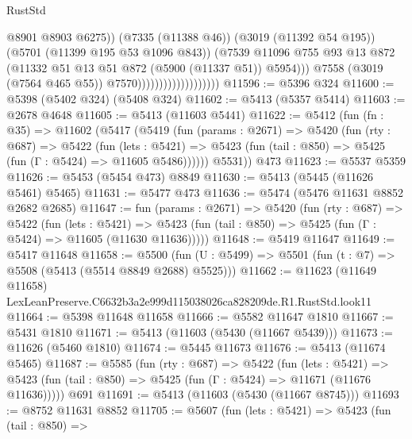 \begin{lexlean}{RustStd}
\begin{coremodule}
                                                @8901
                                                @8903
                                                @6275))
                                            (@7335 (@11388 @46))
                                            (@3019 (@11392 @54 @195))
                                            (@5701 (@11399 @195 @53 @1096 @843))
                                            (@7539
                                              @11096
                                              @755
                                              @93
                                              @13
                                              @872
                                              (@11332 @51 @13 @51 @872 (@5900 (@11337 @51)) @5954)))
                                          @7558
                                          (@3019 (@7564 @465 @55))
                                          @7570)))))))))))))))))))
@11596 := @5396 @324
@11600 := @5398 (@5402 @324) (@5408 @324)
@11602 := @5413 (@5357 @5414)
@11603 := @2678 @4648
@11605 := @5413 (@11603 @5441)
@11622 := @5412
    (fun (fn : @35) =>
    @11602
      (@5417
        (@5419
          (fun (params : @2671) =>
          @5420
            (fun (rty : @687) =>
            @5422
              (fun (lets : @5421) =>
              @5423 (fun (tail : @850) => @5425 (fun (Γ : @5424) => @11605 @5486))))))
        @5531))
    @473
@11623 := @5537 @5359
@11626 := @5453 (@5454 @473) @8849
@11630 := @5413 (@5445 (@11626 @5461) @5465)
@11631 := @5477 @473
@11636 := @5474 (@5476 @11631 @8852 @2682 @2685)
@11647 := fun (params : @2671) =>
  @5420
    (fun (rty : @687) =>
    @5422
      (fun (lets : @5421) =>
      @5423 (fun (tail : @850) => @5425 (fun (Γ : @5424) => @11605 (@11630 @11636)))))
@11648 := @5419 @11647
@11649 := @5417 @11648
@11658 := @5500 (fun (U : @5499) => @5501 (fun (t : @7) => @5508 (@5413 (@5514 @8849 @2688) @5525)))
@11662 := @11623 (@11649 @11658) LexLeanPreserve.C6632b3a2e999d115038026ca828209de.R1.RustStd.look11
@11664 := @5398 @11648 @11658
@11666 := @5582 @11647 @1810
@11667 := @5431 @1810
@11671 := @5413 (@11603 (@5430 (@11667 @5439)))
@11673 := @11626 (@5460 @1810)
@11674 := @5445 @11673
@11676 := @5413 (@11674 @5465)
@11687 := @5585
    (fun (rty : @687) =>
    @5422
      (fun (lets : @5421) =>
      @5423 (fun (tail : @850) => @5425 (fun (Γ : @5424) => @11671 (@11676 @11636)))))
    @691
@11691 := @5413 (@11603 (@5430 (@11667 @8745)))
@11693 := @8752 @11631 @8852
@11705 := @5607
    (fun (lets : @5421) =>
    @5423
      (fun (tail : @850) =>

\end{coremodule}
\end{lexlean}
